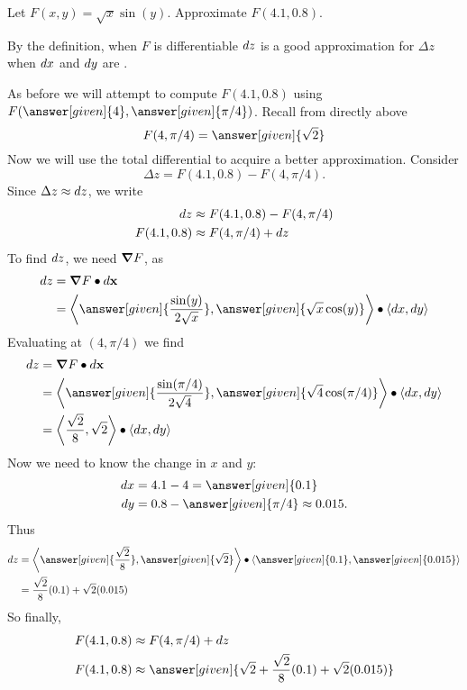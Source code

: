 \documentclass{ximera}
\begin{document}
\begin{example}
  Let $F(x,y)=\sqrt{x}\sin(y)$. Approximate $F(4.1,0.8)$.
  \begin{explanation}
    By the definition, when $F$ is differentiable $\mathop{}\!d z$ is a good
    approximation for $\Delta z$ when $\mathop{}\!d x$ and $\mathop{}\!d y$ are
    .

    As before we will attempt to compute $F(4.1,0.8)$ using
    $F(\answer[given]{4},\answer[given]{\pi/4})$. Recall from directly above
    \[
    F(4,\pi/4) = \answer[given]{\sqrt{2}}
    \]
    Now we will use the total differential to acquire a better
    approximation.  Consider
    \[
    \Delta z = F(4.1,0.8) - F(4,\pi/4).
    \]
    Since $\Delta z\approx \mathop{}\!d z$, we write
    \begin{align*}
      \mathop{}\!d z &\approx F(4.1,0.8) - F(4,\pi/4)\\
      F(4.1,0.8) &\approx F(4,\pi/4)+ \mathop{}\!d z 
    \end{align*}
    To find $\mathop{}\!d z$, we need $\boldsymbol\nabla F$, as
    \begin{align*}
      \d z &= \grad F \dotp \d\vec{x}\\
      &=\vector{\answer[given]{\frac{\sin (y)}{2\sqrt{x}}},\answer[given]{\sqrt{x}\cos (y)}}\dotp\vector{\d x,\d y}
    \end{align*}
    Evaluating at $(4,\pi/4)$ we find
    \begin{align*}
      \d z &= \grad F \dotp \d\vec{x}\\
      &=\vector{\answer[given]{\frac{\sin (\pi/4)}{2\sqrt{4}}}, \answer[given]{\sqrt{4}\cos (\pi/4)}}\dotp\vector{\d x,\d y }\\
      &=\vector{\frac{\sqrt{2}}{8}, \sqrt{2}}\dotp\vector{\d x,\d y }
    \end{align*}
    Now we need to know the change in $x$ and $y$:
    \begin{align*}
      \d x &= 4.1-4= \answer[given]{0.1}\\
    \d y &= 0.8 -\answer[given]{\pi/4} \approx 0.015.\\
    \end{align*}
    Thus
    \begin{align*}
      \d z &=  \vector{\answer[given]{\frac{\sqrt{2}}{8}}, \answer[given]{\sqrt{2}}}\dotp\vector{\answer[given]{0.1},\answer[given]{0.015}}\\ 
      &= \frac{\sqrt{2}}8(0.1) + \sqrt{2}(0.015)\\
    \end{align*}
    So finally,
    \begin{align*}
    F(4.1,0.8) &\approx F(4,\pi/4) + \d z\\
    F(4.1,0.8) &\approx \answer[given]{\sqrt{2} + \frac{\sqrt{2}}{8}(0.1) + \sqrt{2}(0.015)}
    \end{align*}
  \end{explanation}
\end{example}
\end{document}
